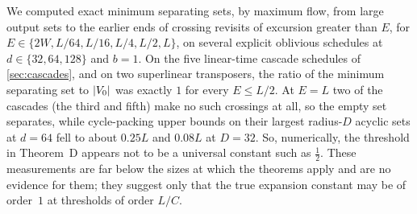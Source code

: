 \begin{remark}[Numerical]\label{rem:numerics-crossings}
We computed exact minimum separating sets, by maximum flow, from large output sets to the earlier ends of crossing revisits of
excursion greater than $E$, for $E\in\{2W,L/64,L/16,L/4,L/2,L\}$, on several explicit oblivious schedules at
$d\in\{32,64,128\}$ and $b=1$. On the five linear-time cascade schedules of \cref{sec:cascades}, and on two superlinear transposers,
the ratio of the minimum separating set to $\lvert V_0 \rvert$ was exactly $1$ for every $E\le L/2$. At $E=L$ two of the cascades (the third and
fifth) make no such crossings at all, so the empty set separates, while cycle-packing upper bounds on their largest radius-$D$ acyclic
sets at $d=64$ fell to about $0.25L$ and $0.08L$ at $D=32$. So, numerically, the threshold in Theorem~D appears not to be a universal constant such as $\frac12$. These measurements are far below the
sizes at which the theorems apply and are no evidence for them; they suggest only that the true expansion constant may be of
order~$1$ at thresholds of order $L/C$.
\end{remark}
